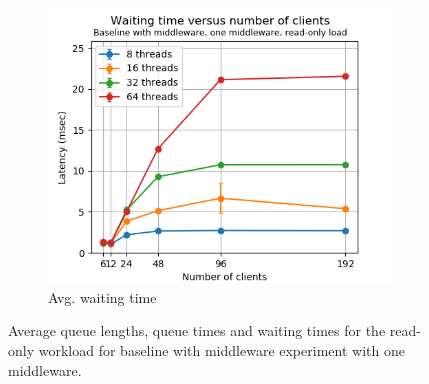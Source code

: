 \documentclass[11pt,a4paper]{article}
\begin{document}
\begin{figure}[h]
\begin{subfigure}{.33\textwidth}
\end{subfigure}%
\begin{subfigure}{.33\textwidth}
  \centering
  \includegraphics[width=1.0\linewidth,trim={5px 0px 20px 0px},clip]{img/plot/mwb1-ro-wtime-mini.png}
  \caption{Avg. waiting time}
  \label{fig:mwb1-ro-wtime-mini}
\end{subfigure}
\caption{Average queue lengths, queue times and waiting times for the read-only workload for baseline with middleware experiment with one middleware.}
\label{fig:mwb1-ro-mini}
\end{figure}
\end{document}
